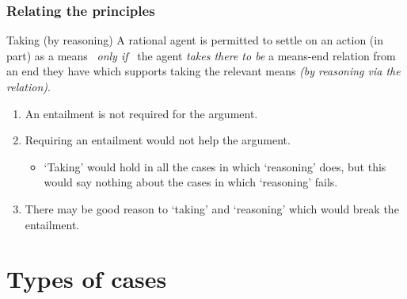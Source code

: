 \documentclass[noamssymb,
]{beamer} %
\begin{document}
\begin{frame}
  \frametitle{Relating the principles}

  \begin{block}{Taking (by reasoning)}
    A rational agent is permitted to settle on an action (in part) as a means
    \newline
    \mbox{ }\hfill\emph{only if}\hfill\mbox{ }
    \newline
    the agent \emph{takes there to be}  a means-end relation from an end they have which supports taking the relevant means \emph{(by reasoning via the relation)}.
  \end{block}

  \begin{enumerate}
  \item An entailment is not required for the argument.
  \item Requiring an entailment would not help the argument.
    \begin{itemize}
    \item `Taking' would hold in all the cases in which `reasoning' does, but this would say nothing about the cases in which `reasoning' fails.
    \end{itemize}
  \item There may be good reason to `taking' and `reasoning' which would break the entailment.
  \end{enumerate}
\end{frame}

\section{Types of cases}
\end{document}
